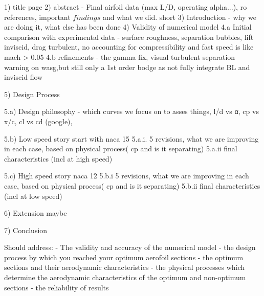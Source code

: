 \justify

1) title page
2) abstract - Final airfoil data (max L/D, operating alpha...), ro references, important $findings$ and what we did. short
3) Introduction -  why we are doing it, what else has been done
4) Validity of numerical model
    4.a Initial comparison with experimental data - surface roughness, separation bubbles, lift inviscid, drag turbulent, no accounting for compressibility and fast speed is like mach > 0.05
    4.b refinements - the gamma fix, visual turbulent separation warning on wasg,but still only a 1st order bodge as not fully integrate BL and inviscid flow
    
5) Design Process

  5.a) Design philosophy - which curves we focus on to asses things, l/d vs α, cp vs x/c, cl vs cd (google), 

  5.b) Low speed story start with naca 15
    5.a.i. 5 revisions, what we are improving in each case, based on physical process( cp and is it separating)
    5.a.ii final characteristics (incl at high speed)

  5.c) High speed story naca 12
    5.b.i  5 revisions, what we are improving in each case, based on physical process( cp and is it separating)
    5.b.ii final characteristics (incl at low speed)
    
6) Extension maybe

7) Conclusion
    




Should address:
 - The validity and accuracy of the numerical model
 - the design process by which you reached your optimum aerofoil sections
 - the optimum sections and their aerodynamic characteristics
 - the physical processes which determine the aerodynamic characteristics of the optimum and non-optimum sections
 - the reliability of results